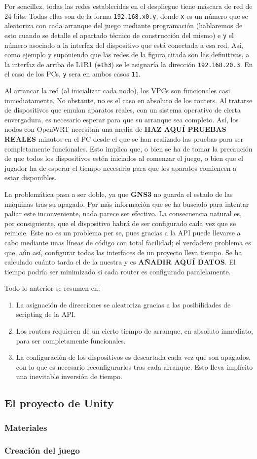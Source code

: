 Por sencillez, todas las redes establecidas en el despliegue tiene máscara de red de 24 bits. Todas ellas son de la forma \texttt{192.168.x0.y}, donde \texttt{x} es un número que se aleatoriza con cada arranque del juego mediante programación (hablaremos de esto cuando se detalle el apartado técnico de construcción del mismo) e \texttt{y} el número asociado a la interfaz del dispositivo que está conectada a esa red. Así, como ejemplo y suponiendo que las redes de la figura citada son las definitivas, a la interfaz de arriba de L1R1 (\texttt{eth3}) se le asignaría la dirección \texttt{192.168.20.3}. En el caso de los PCs, \texttt{y} sera en ambos casos \texttt{11}.

Al arrancar la red (al inicializar cada nodo), los VPCs son funcionales casi inmediatamente. No obstante, no es el caso en absoluto de los routers. Al tratarse de dispositivos que emulan aparatos reales, con un sistema operativo de cierta envergadura, es necesario esperar para que su arranque sea completo. Así, los nodos con OpenWRT necesitan una media de \textbf{HAZ AQUÍ PRUEBAS REALES} minutos en el PC desde el que se han realizado las pruebas para ser completamente funcionales. Esto implica que, o bien se ha de tomar la precaución de que todos los dispositivos estén iniciados al comenzar el juego, o bien que el jugador ha de esperar el tiempo necesario para que los aparatos comiencen a estar disponibles.

La problemática pasa a ser doble, ya que \textbf{GNS3} no guarda el estado de las máquinas tras su apagado. Por más información que se ha buscado para intentar paliar este inconveniente, nada parece ser efectivo. La consecuencia natural es, por consiguiente, que el dispositivo habrá de ser configurado cada vez que se reinicie. Este no es un problema per se, pues gracias a la API puede llevarse a cabo mediante unas líneas de código con total facilidad; el verdadero problema es que, aún así, configurar todas las interfaces de un proyecto lleva tiempo. Se ha calculado cuánto tarda el de la nuestra y es \textbf{AÑADIR AQUÍ DATOS}. El tiempo podría ser minimizado si cada router es configurado paralelamente.

Todo lo anterior se resumen en:
\begin{enumerate}
\item La asignación de direcciones se aleatoriza gracias a las posibilidades de scripting de la API.
\item Los routers requieren de un cierto tiempo de arranque, en absoluto inmediato, para ser completamente funcionales.
\item La configuración de los dispositivos es descartada cada vez que son apagados, con lo que es necesario reconfigurarlos tras cada arranque. Esto lleva implícito una inevitable inversión de tiempo.
\end{enumerate}

\subsection{El proyecto de Unity}

\subsubsection{Materiales}

\subsubsection{Creación del juego}
